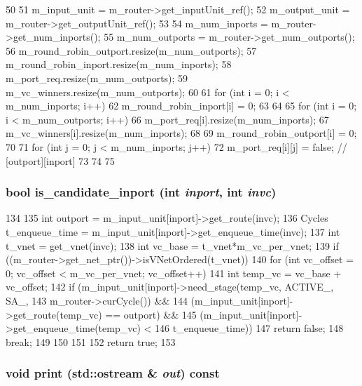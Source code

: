 \begin{DoxyCode}
50 {
51     m_input_unit = m_router->get_inputUnit_ref();
52     m_output_unit = m_router->get_outputUnit_ref();
53 
54     m_num_inports = m_router->get_num_inports();
55     m_num_outports = m_router->get_num_outports();
56     m_round_robin_outport.resize(m_num_outports);
57     m_round_robin_inport.resize(m_num_inports);
58     m_port_req.resize(m_num_outports);
59     m_vc_winners.resize(m_num_outports);
60 
61     for (int i = 0; i < m_num_inports; i++) {
62         m_round_robin_inport[i] = 0;
63     }
64 
65     for (int i = 0; i < m_num_outports; i++) {
66         m_port_req[i].resize(m_num_inports);
67         m_vc_winners[i].resize(m_num_inports);
68 
69         m_round_robin_outport[i] = 0;
70 
71         for (int j = 0; j < m_num_inports; j++) {
72             m_port_req[i][j] = false; // [outport][inport]
73         }
74     }
75 }
\end{DoxyCode}
\hypertarget{classSWallocator__d_ae08b6831390b7d551e176fe35de2bd38}{
\subsubsection[{is\_\-candidate\_\-inport}]{\setlength{\rightskip}{0pt plus 5cm}bool is\_\-candidate\_\-inport (int {\em inport}, \/  int {\em invc})}}
\label{classSWallocator__d_ae08b6831390b7d551e176fe35de2bd38}



\begin{DoxyCode}
134 {
135     int outport = m_input_unit[inport]->get_route(invc);
136     Cycles t_enqueue_time = m_input_unit[inport]->get_enqueue_time(invc);
137     int t_vnet = get_vnet(invc);
138     int vc_base = t_vnet*m_vc_per_vnet;
139     if ((m_router->get_net_ptr())->isVNetOrdered(t_vnet)) {
140         for (int vc_offset = 0; vc_offset < m_vc_per_vnet; vc_offset++) {
141             int temp_vc = vc_base + vc_offset;
142             if (m_input_unit[inport]->need_stage(temp_vc, ACTIVE_, SA_,
143                                                  m_router->curCycle()) &&
144                (m_input_unit[inport]->get_route(temp_vc) == outport) &&
145                (m_input_unit[inport]->get_enqueue_time(temp_vc) <
146                     t_enqueue_time)) {
147                 return false;
148                 break;
149             }
150         }
151     }
152     return true;
153 }
\end{DoxyCode}
\hypertarget{classSWallocator__d_ac55fe386a101fbae38c716067c9966a0}{
\subsubsection[{print}]{\setlength{\rightskip}{0pt plus 5cm}void print (std::ostream \& {\em out}) const}}
\label{classSWallocator__d_ac55fe386a101fbae38c716067c9966a0}


